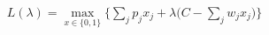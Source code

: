 \documentclass[preview]{standalone}
\begin{document}
\begin{align*}
L(\lambda) = \max_{x\in\{0,1\}} \Bigg\{ \sum_j p_j x_j + \lambda\Big(C - \sum_j w_j x_j\Big)\Bigg\}
\end{align*}
\end{document}
